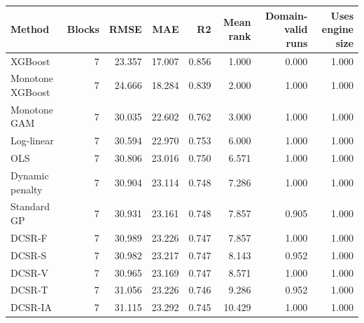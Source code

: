 \begin{tabular}{lrrrrrrr}
\toprule
Method & Blocks & RMSE & MAE & R2 & Mean rank & Domain-valid runs & Uses engine size \\
\midrule
XGBoost & 7 & 23.357 & 17.007 & 0.856 & 1.000 & 0.000 & 1.000 \\
Monotone XGBoost & 7 & 24.666 & 18.284 & 0.839 & 2.000 & 1.000 & 1.000 \\
Monotone GAM & 7 & 30.035 & 22.602 & 0.762 & 3.000 & 1.000 & 1.000 \\
Log-linear & 7 & 30.594 & 22.970 & 0.753 & 6.000 & 1.000 & 1.000 \\
OLS & 7 & 30.806 & 23.016 & 0.750 & 6.571 & 1.000 & 1.000 \\
Dynamic penalty & 7 & 30.904 & 23.114 & 0.748 & 7.286 & 1.000 & 1.000 \\
Standard GP & 7 & 30.931 & 23.161 & 0.748 & 7.857 & 0.905 & 1.000 \\
DCSR-F & 7 & 30.989 & 23.226 & 0.747 & 7.857 & 1.000 & 1.000 \\
DCSR-S & 7 & 30.982 & 23.217 & 0.747 & 8.143 & 0.952 & 1.000 \\
DCSR-V & 7 & 30.965 & 23.169 & 0.747 & 8.571 & 1.000 & 1.000 \\
DCSR-T & 7 & 31.056 & 23.226 & 0.746 & 9.286 & 0.952 & 1.000 \\
DCSR-IA & 7 & 31.115 & 23.292 & 0.745 & 10.429 & 1.000 & 1.000 \\
\bottomrule
\end{tabular}
